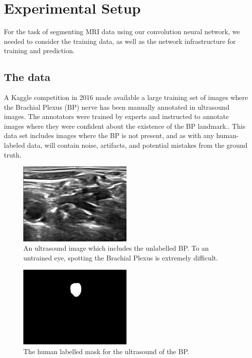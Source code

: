 \documentclass[letterpaper]{article}
\begin{document}
\section{Experimental Setup}
For the task of segmenting MRI data using our convolution neural network, we needed to consider the training data, as well as the network infrastructure for training and prediction.

\subsection{The data}
A Kaggle competition in 2016 made available a large training set of images where the Brachial Plexus (BP) nerve has been manually annotated in ultrasound images. The annotators were trained by experts and instructed to annotate images where they were confident about the existence of the BP landmark.. This data set includes images where the BP is not present, and as with any human-labeled data, will contain noise, artifacts, and potential mistakes from the ground truth. 

 \begin{figure}[H]
  \centerline{\includegraphics[width=0.5\textwidth]{Images/1_4.png}}
  \caption{An ultrasound image which includes the unlabelled BP. To an untrained eye, spotting the Brachial Plexus is extremely difficult.}
  \label{fig:BPInUltrasound}
\end{figure}

 \begin{figure}[H]
  \centerline{\includegraphics[width=0.5\textwidth]{Images/1_4_mask.png}}
  \caption{The human labelled mask for the ultrasound of the BP.}
  \label{fig:BPMask}
\end{figure}
\end{document}
